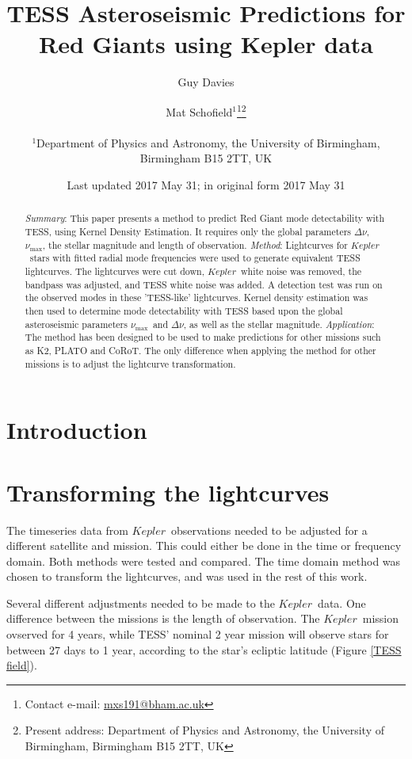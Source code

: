 \documentclass[a4paper,fleqn,usenatbib,useAMS]{mnras}
\title[TRG]{TESS Asteroseismic Predictions for Red Giants using Kepler data}
\author[Mat Schofield]{Mat Schofield$^{1}$\thanks{Contact e-mail: \href{mailto:mxs191@bham.ac.uk}{mxs191@bham.ac.uk}}\thanks{Present address: Department of Physics and Astronomy, the University of Birmingham, Birmingham B15 2TT, UK}
\author[Guy Davies]{Guy Davies}
\\
$^{1}$Department of Physics and Astronomy, the University of Birmingham, Birmingham B15 2TT, UK}
\date{Last updated 2017 May 31; in original form 2017 May 31}
\newcommand{\numax}{\ensuremath{\nu_{\textrm{max}}}}
\newcommand{\dnu}{\ensuremath{\Delta\nu}}
\newcommand{\kep}{\ensuremath{Kepler}}
\begin{document}
\label{firstpage}
\pagerange{\pageref{firstpage}--\pageref{lastpage}}
\maketitle

\begin{abstract}
{\it Summary}: This paper presents a method to predict Red Giant mode detectability with TESS, using Kernel Density Estimation. It requires only the global parameters \dnu, \numax, the stellar magnitude and length of observation. \newline
{\it Method}: Lightcurves for \kep \ stars with fitted radial mode frequencies were used to generate equivalent TESS lightcurves. The lightcurves were cut down, \kep \ white noise was removed, the bandpass was adjusted, and TESS white noise was added. A detection test was run on the observed modes in these 'TESS-like' lightcurves. Kernel density estimation was then used to determine mode detectability with TESS based upon the global asteroseismic parameters \numax \ and \dnu, as well as the stellar magnitude.\newline
{\it Application}: The method has been designed to be used to make predictions for other missions such as K2, PLATO and CoRoT. The only difference when applying the method for other missions is to adjust the lightcurve transformation.
\end{abstract}


\section{Introduction}


\section{Transforming the lightcurves}

The timeseries data from \kep \ observations needed to be adjusted for a different satellite and mission. This could either be done in the time or frequency domain. Both methods were tested and compared. The time domain method was chosen to transform the lightcurves, and was used in the rest of this work.

Several different adjustments needed to be made to the \kep \ data. One difference between the missions is the length of observation. The \kep \ mission ovserved for 4 years, while TESS' nominal 2 year mission will observe stars for between 27 days to 1 year, according to the star's ecliptic latitude (Figure \ref{TESS field}).
\end{document}
